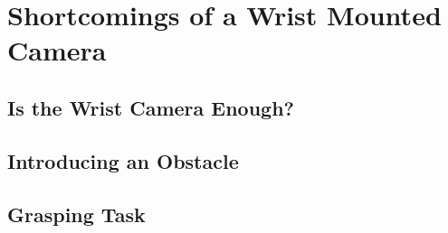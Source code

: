 \section{Shortcomings of a Wrist Mounted Camera}

\subsection{Is the Wrist Camera Enough?}

\subsection{Introducing an Obstacle}

\subsection{Grasping Task}

